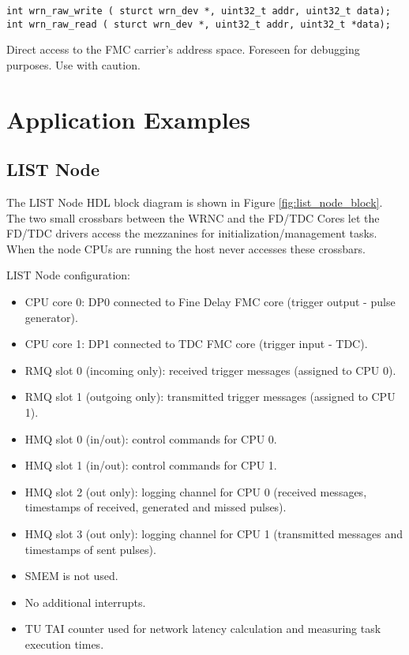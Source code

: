 \documentclass{article}
\begin{document}
\begin{verbatim}
int wrn_raw_write ( sturct wrn_dev *, uint32_t addr, uint32_t data);
int wrn_raw_read ( sturct wrn_dev *, uint32_t addr, uint32_t *data);
\end{verbatim}
Direct access to the FMC carrier's address space. Foreseen for debugging purposes. Use with caution.

\section{Application Examples}

\subsection{LIST Node}

The LIST Node HDL block diagram is shown in Figure \ref{fig:list_node_block}. The two small crossbars
between the WRNC and the FD/TDC Cores let the FD/TDC drivers access the mezzanines for initialization/management tasks. When the node CPUs are running the host never accesses these crossbars.

LIST Node configuration:

\begin{itemize}
\item CPU core 0: DP0 connected to Fine Delay FMC core (trigger output - pulse generator).
\item CPU core 1: DP1 connected to TDC FMC core (trigger input - TDC).
\item RMQ slot 0 (incoming only): received trigger messages (assigned to CPU 0).
\item RMQ slot 1 (outgoing only): transmitted trigger messages (assigned to CPU 1).
\item HMQ slot 0 (in/out): control commands for CPU 0.
\item HMQ slot 1 (in/out): control commands for CPU 1.
\item HMQ slot 2 (out only): logging channel for CPU 0 (received messages, timestamps of received, generated and missed pulses).
\item HMQ slot 3 (out only): logging channel for CPU 1 (transmitted messages and timestamps of sent pulses).
\item SMEM is not used.
\item No additional interrupts.
\item TU TAI counter used for network latency calculation and measuring task execution times.
\end {itemize}
\end{document}
